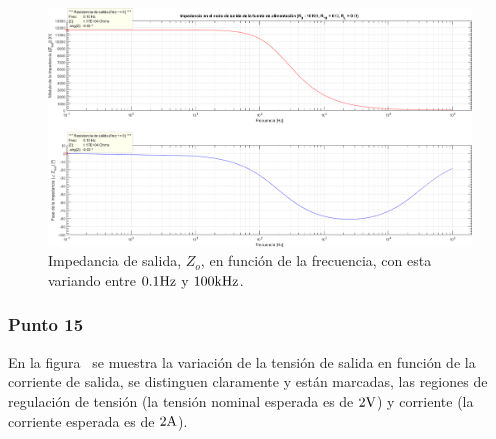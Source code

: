 \clearpage

\begin{figure}[H] %
\begin{center}
\includegraphics[width=1.2 \textwidth, angle=90]{./img/preguntas/p21_14.png}
\caption{\label{fig:fig_p21_p14_output_impedance}\footnotesize{Impedancia de salida, $Z_{o}$, en función de la frecuencia, con esta variando entre $0.1 \si[per-mode=symbol]{\hertz}$ y $100 \si[per-mode=symbol]{\kilo\hertz}$.}}
\end{center}
\end{figure}



\clearpage



\subsubsection{Punto 15}







En la figura~ se muestra la variación de la tensión de salida en función de la corriente de salida, se distinguen claramente y están marcadas, las regiones de regulación de tensión (la tensión nominal esperada es de $2 \si[per-mode=symbol]{\volt}$) y corriente (la corriente esperada es de $2 \si[per-mode=symbol]{\ampere}$).



\clearpage

